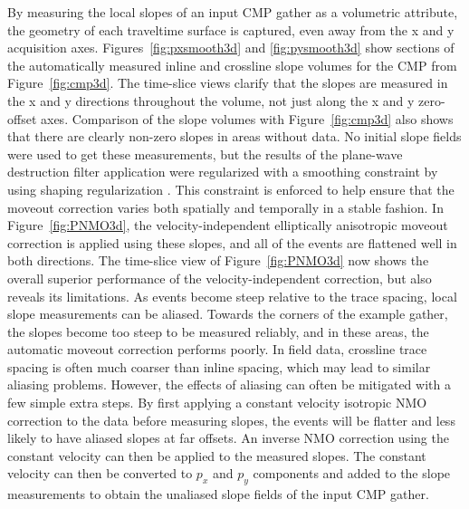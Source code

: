 By measuring the local slopes of an input CMP gather as a volumetric attribute, the geometry of each traveltime surface is captured, even away from the x and y acquisition axes.  Figures~\ref{fig:pxsmooth3d} and  \ref{fig:pysmooth3d} show sections of the automatically measured inline and crossline slope volumes for the CMP from Figure~\ref{fig:cmp3d}.  The time-slice views clarify that the slopes are measured in the x and y directions throughout the volume, not just along the x and y zero-offset axes.  Comparison of the slope volumes with Figure~\ref{fig:cmp3d} also shows that there are clearly non-zero slopes in areas without data.  No initial slope fields were used to get these measurements, but the results of the plane-wave destruction filter application were regularized with a smoothing constraint by using shaping regularization \cite[]{fomel07}.  This constraint is enforced to help ensure that the moveout correction varies both spatially and temporally in a stable fashion.  In Figure~\ref{fig:PNMO3d}, the velocity-independent elliptically anisotropic moveout correction is applied using these slopes, and all of the events are flattened well in both directions.  The time-slice view of Figure~\ref{fig:PNMO3d} now shows the overall superior performance of the velocity-independent correction, but also reveals its limitations.  As events become steep relative to the trace spacing, local slope measurements can be aliased.  Towards the corners of the example gather, the slopes become too steep to be measured reliably, and in these areas, the automatic moveout correction performs poorly.  In field data, crossline trace spacing is often much coarser than inline spacing, which may lead to similar aliasing problems.  However, the effects of aliasing can often be mitigated with a few simple extra steps.  By first applying a constant velocity isotropic NMO correction to the data before measuring slopes, the events will be flatter and less likely to have aliased slopes at far offsets.  An inverse NMO correction using the constant velocity can then be applied to the measured slopes.  The constant velocity can then be converted to $p_x$ and $p_y$ components and added to the slope measurements to obtain the unaliased slope fields of the input CMP gather. 

